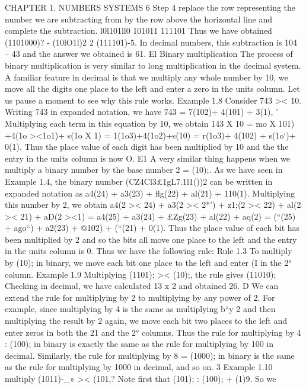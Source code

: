 CHAPTER 1. NUMBERS SYSTEMS 6
Step 4 \Ve replace the row representing the number we are subtracting from by the row above
the horizontal line and complete the subtraction.
l0l101ll0
101011
111101
Thus we have obtained (1101000)? - (10lO1l)2 2 (111101)-5. In decimal numbers, this subtraction
is 104 -- 43 and the answer we obtained is 61. El
Binary multiplication
The process of binary multiplication is very similar to long multiplication in the decimal system.
A familiar feature in decimal is that \vhen we multiply any whole number by 10, we move all the
digits one place to the left and enter a zero in the units column. Let us pause a moment to see
why this rule works.
Example 1.8 Consider 743 >< 10. Writing 743 in expanded notation, we have
743 = 7(102)+ 4(101) + 3(1), '
Multiplying each term in this equation by 10, we obtain
143 X 10 = mo X 101) +4(1o ><1o1)+ s(1o X 1)
= 1(1o3)+4(1o2)+s(10)
= r(1o3)+ 4(102) + s(1o‘)+ 0(1).
Thus the place value of each digit has been multiplied by 10 and the the entry in the units column
is now O. E1
A very similar thing happens when we multiply a binary number by the base number 2 = (10);.
As we have seen in Example 1.4, the binary number (CZ4Cl3£1gL7.1l1())2 can be written in expanded
notation as
a4(24) + a3(23) + ﬂg(22) + al(21) + 110(1).
Multiplying this number by 2, we obtain
a4(2 >< 24) + a3(2 >< 2*’) + z1;(2 >< 22) + al(2 >< 21) + aD(2 ><1)
= a4(25) + a3(24) + £Zg(23) + al(22) + aq(2)
= (“(25) + ago“) + a2(23) + @102) + (“(21) + 0(1).
Thus the place value of each bit has been multiplied by 2 and so the bits all move one place to the
left and the entry in the units column is 0. Thus we have the following rule:
Rule 1.3 To multiply by (10); in binary, we move each bit one place to the left and enter (I in the
2° column.
Example 1.9 Multiplying (1101); >< (10);, the rule gives (11010); Checking in decimal, we have
calculated 13 x 2 and obtained 26. D
We can extend the rule for multiplying by 2 to multiplying by any power of 2. For example, since
multiplying by 4 is the same as multiplying b“y 2 and then multiplying the result by 2 again, we
move each bit two places to the left and enter zeros in both the 21 and the 2° columns. Thus the
rule for multiplying by 4 : (100); in binary is exactly the same as the rule for multiplying by 100
in decimal. Similarly, the rule for multiplying by 8 = (1000); in binary is the same as the rule for
multiplying by 1000 in decimal, and so on. 3
Example 1.10 \Ve multiply (1011)-_» >< (101,? Note ﬁrst that (101); : (100); + (1)9. So we



